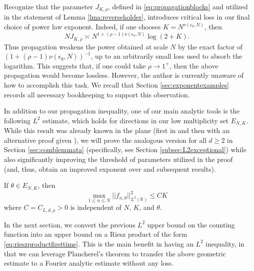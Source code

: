 \documentclass[12pt]{amsart}
\numberwithin{equation}{section}
\begin{document}
\begin{remark}\label{rmk:lossy}
\rm{
Recognize that the parameter $J_{K,\rho}$, defined in \eqref{eq:propagationblocks} and utilized in the statement of Lemma \ref{lma:reverseholder}, introduces critical loss in our final choice of power law exponent. Indeed, if one chooses $K=N^{\nu(\epsilon_0,N)}$, then
\[
NJ_{K,\rho}\asymp N^{1+(\rho-1)\nu(\epsilon_0,N)}\log(2+K).
\]
Thus propagation weakens the power obtained at scale $N$ by the exact factor of $(1+(\rho-1)\nu(\epsilon_0,N))^{-1}$, up to an arbitrarily small loss used to absorb the logarithm. This suggests that, if one could take $\rho \rightarrow 1^+$, then the above propagation would become lossless. However, the author is currently unaware of how to accomplish this task. We recall that Section \ref{sec:exponentexamples} records all necessary bookkeeping to support this observation.
}
\end{remark}

In addition to our propagation inequality, one of our main analytic tools is the following $L^2$ estimate, which holds for directions in our low multiplicity set $E_{N,K}$. While this result was already known in the plane (first in \cite{NPV} and then with an alternative proof given \cite[Section 5]{BThesis}), we will prove the analogous version for all $d \geq 2$ in Section \ref{sec:comblemmata} (specifically, see Section \ref{subsec:L2exceptional}) while also significantly improving the threshold of parameters utilized in the proof (and, thus, obtain an improved exponent over \cite{NPV} and subsequent results).

\medskip

\begin{lemma}\label{lma:L2exceptionalset}
    If $\theta \in E_{N,K}$, then
    \begin{equation}\label{eq:L2exceptionalset}
    \max_{1 \leq n \leq N} \vert \vert f_{n, \theta}\vert\vert_{L^2 (\mathbb{R})}^2 \leq C K
    \end{equation}
    where $C=C_{L,d,\rho}>0$ is independent of $N$, $K$, and $\theta$.
\end{lemma}

In the next section, we convert the previous $L^2$ upper bound on the counting function into an upper bound on a Riesz product of the form \eqref{eq:rieszproductfirsttime}. This is the main benefit in having an $L^2$ inequality, in that we can leverage Plancherel's theorem to transfer the above geometric estimate to a Fourier analytic estimate without any loss.
\end{document}
